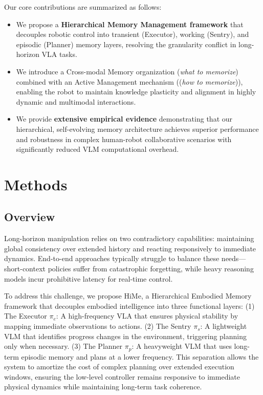 Our core contributions are summarized as follows:
\begin{itemize}
    \item We propose a \textbf{Hierarchical Memory Management framework} that decouples robotic control into transient (Executor), working (Sentry), and episodic (Planner) memory layers, resolving the granularity conflict in long-horizon VLA tasks.
    \item  We introduce a Cross-modal Memory organization (\textit{what to memorize}) combined with an Active Management mechanism ((\textit{how to memorize})), enabling the robot to maintain knowledge plasticity and alignment in highly dynamic and multimodal interactions.
    \item We provide \textbf{extensive empirical evidence} demonstrating that our hierarchical, self-evolving memory architecture achieves superior performance and robustness in complex human-robot collaborative scenarios with significantly reduced VLM computational overhead.
\end{itemize}


\section{Methods}
\subsection{Overview}
Long-horizon manipulation relies on two contradictory capabilities: maintaining global consistency over extended history and reacting responsively to immediate dynamics. End-to-end approaches typically struggle to balance these needs—short-context policies suffer from catastrophic forgetting, while heavy reasoning models incur prohibitive latency for real-time control.

To address this challenge, we propose HiMe, a Hierarchical Embodied Memory framework that decouples embodied intelligence into three functional layers: 
(1) The Executor $\pi_e$: A high-frequency VLA that ensures physical stability by mapping immediate observations to actions. 
(2) The Sentry $\pi_s$: A lightweight VLM that identifies progress changes in the environment, triggering planning only when necessary.
(3) The Planner $\pi_p$: A heavyweight VLM that uses long-term episodic memory and plans at a lower frequency.
This separation allows the system to amortize the cost of complex planning over extended execution windows, ensuring the low-level controller remains responsive to immediate physical dynamics while maintaining long-term task coherence. 

